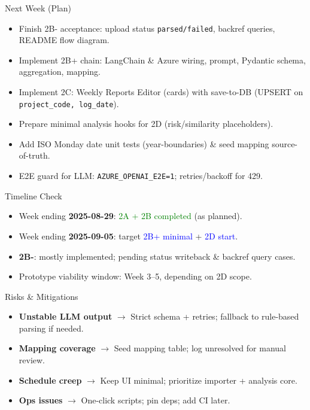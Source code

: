 \documentclass [aspectratio=169]{beamer}
\begin{document}
\begin{frame}{Next Week (Plan)}
\begin{itemize}
    \item Finish 2B- acceptance: upload status \texttt{parsed/failed}, backref queries, README flow diagram.
    \item Implement 2B+ chain: LangChain \& Azure wiring, prompt, Pydantic schema, aggregation, mapping.
    \item Implement 2C: Weekly Reports Editor (cards) with save-to-DB (UPSERT on \texttt{project\_code, log\_date}).
    \item Prepare minimal analysis hooks for 2D (risk/similarity placeholders).
    \item Add ISO Monday date unit tests (year-boundaries) \& seed mapping source-of-truth.
    \item E2E guard for LLM: \texttt{AZURE\_OPENAI\_E2E=1}; retries/backoff for 429.
\end{itemize}
\end{frame}

\begin{frame}{Timeline Check}
\begin{itemize}
    \item Week ending \textbf{2025-08-29}: \textcolor{green}{2A + 2B completed} (as planned).
    \item Week ending \textbf{2025-09-05}: target \textcolor{blue}{2B+ minimal} + \textcolor{blue}{2D start}.
    \item \textbf{2B-}: mostly implemented; pending status writeback \& backref query cases.
    \item Prototype viability window: Week 3–5, depending on 2D scope.
\end{itemize}
\end{frame}

\begin{frame}{Risks \& Mitigations}
\begin{itemize}
    \item \textbf{Unstable LLM output} $\rightarrow$ Strict schema + retries; fallback to rule-based parsing if needed.
    \item \textbf{Mapping coverage} $\rightarrow$ Seed mapping table; log unresolved for manual review.
    \item \textbf{Schedule creep} $\rightarrow$ Keep UI minimal; prioritize importer + analysis core.
    \item \textbf{Ops issues} $\rightarrow$ One-click scripts; pin deps; add CI later.
\end{itemize}
\end{frame}
\end{document}
